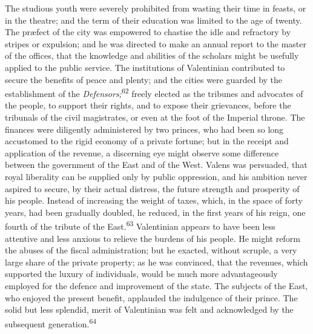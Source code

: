 

The studious youth were severely prohibited from wasting their
time in feasts, or in the theatre; and the term of their
education was limited to the age of twenty. The præfect of the
city was empowered to chastise the idle and refractory by stripes
or expulsion; and he was directed to make an annual report to the
master of the offices, that the knowledge and abilities of the
scholars might be usefully applied to the public service. The
institutions of Valentinian contributed to secure the benefits of
peace and plenty; and the cities were guarded by the
establishment of the \textit{Defensors;}\textsuperscript{62} freely elected as the
tribunes and advocates of the people, to support their rights,
and to expose their grievances, before the tribunals of the civil
magistrates, or even at the foot of the Imperial throne. The
finances were diligently administered by two princes, who had
been so long accustomed to the rigid economy of a private
fortune; but in the receipt and application of the revenue, a
discerning eye might observe some difference between the
government of the East and of the West. Valens was persuaded,
that royal liberality can be supplied only by public oppression,
and his ambition never aspired to secure, by their actual
distress, the future strength and prosperity of his people.
Instead of increasing the weight of taxes, which, in the space of
forty years, had been gradually doubled, he reduced, in the first
years of his reign, one fourth of the tribute of the East.\textsuperscript{63}
Valentinian appears to have been less attentive and less anxious
to relieve the burdens of his people. He might reform the abuses
of the fiscal administration; but he exacted, without scruple, a
very large share of the private property; as he was convinced,
that the revenues, which supported the luxury of individuals,
would be much more advantageously employed for the defence and
improvement of the state. The subjects of the East, who enjoyed
the present benefit, applauded the indulgence of their prince.
The solid but less splendid, merit of Valentinian was felt and
acknowledged by the subsequent generation.\textsuperscript{64}

